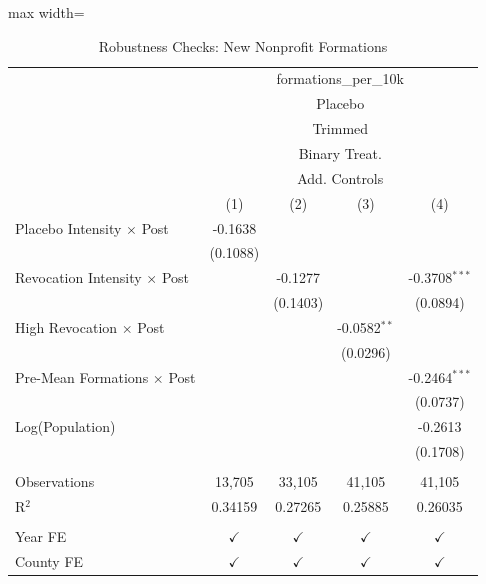 
\begin{table}[htbp]
   \caption{\label{tab:robustness} Robustness Checks: New Nonprofit Formations}
   \bigskip
   \centering
   \begin{adjustbox}{max width=\textwidth}
   \begin{tabular}{lcccc}
      \toprule
       & \multicolumn{4}{c}{formations\_per\_10k}\\
       & \multicolumn{4}{c}{Placebo} \\ 
       & \multicolumn{4}{c}{Trimmed} \\ 
       & \multicolumn{4}{c}{Binary Treat.} \\ 
       & \multicolumn{4}{c}{Add. Controls} \\ 
                                          & (1)           & (2)           & (3)            & (4)\\  
      \midrule 
      Placebo Intensity $\times$ Post     & -0.1638       &               &                &   \\   
                                          & (0.1088)      &               &                &   \\   
      Revocation Intensity $\times$ Post  &               & -0.1277       &                & -0.3708$^{***}$\\   
                                          &               & (0.1403)      &                & (0.0894)\\   
      High Revocation $\times$ Post       &               &               & -0.0582$^{**}$ &   \\   
                                          &               &               & (0.0296)       &   \\   
      Pre-Mean Formations $\times$ Post   &               &               &                & -0.2464$^{***}$\\   
                                          &               &               &                & (0.0737)\\   
      Log(Population)                     &               &               &                & -0.2613\\   
                                          &               &               &                & (0.1708)\\   
       \\
      Observations                        & 13,705        & 33,105        & 41,105         & 41,105\\  
      R$^2$                               & 0.34159       & 0.27265       & 0.25885        & 0.26035\\  
       \\
      Year FE                             & $\checkmark$  & $\checkmark$  & $\checkmark$   & $\checkmark$\\   
      County FE                           & $\checkmark$  & $\checkmark$  & $\checkmark$   & $\checkmark$\\   
      \bottomrule
   \end{tabular}
   \end{adjustbox}
\end{table}


